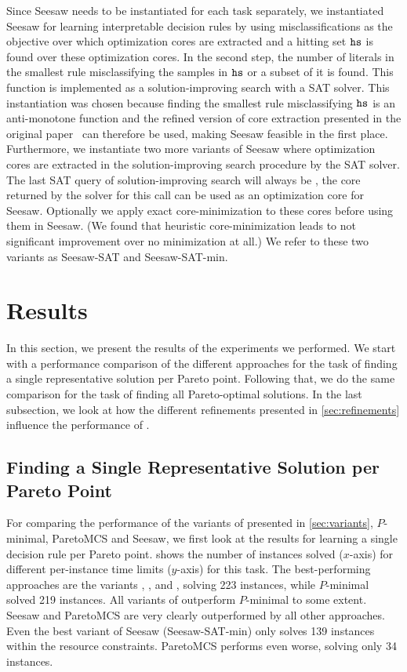 Since Seesaw needs to be instantiated for each task separately, we instantiated Seesaw for learning interpretable decision rules by using misclassifications as the objective over which optimization cores are extracted and a hitting set $\texttt{hs}$ is found over these optimization cores.
In the second step, the number of literals in the smallest rule misclassifying the samples in $\texttt{hs}$ or a subset of it is found.
This function is implemented as a solution-improving search with a SAT solver.
This instantiation was chosen because finding the smallest rule misclassifying $\texttt{hs}$ is an anti-monotone function and the refined version of core extraction presented in the original paper~\autocite{DBLP:conf/cp/JanotaMSM21} can therefore be used, making Seesaw feasible in the first place.
Furthermore, we instantiate two more variants of Seesaw where optimization cores are extracted in the solution-improving search procedure by the SAT solver.
The last SAT query of solution-improving search will always be \unsat{}, the core returned by the solver for this call can be used as an optimization core for Seesaw.
Optionally we apply exact core-minimization to these cores before using them in Seesaw.
(We found that heuristic core-minimization leads to not significant improvement over no minimization at all.)
We refer to these two variants as Seesaw-SAT and Seesaw-SAT-min.

\section{Results\label{sec:results}}

In this section, we present the results of the experiments we performed.
We start with a performance comparison of the different approaches for the task of finding a single representative solution per Pareto point.
Following that, we do the same comparison for the task of finding all Pareto-optimal solutions.
In the last subsection, we look at how the different refinements presented in \cref{sec:refinements} influence the performance of \algname{}.

\subsection{Finding a Single Representative Solution per Pareto Point}

For comparing the performance of the variants of \algname{} presented in \cref{sec:variants}, $P$-minimal, ParetoMCS and Seesaw, we first look at the results for learning a single decision rule per Pareto point.
 shows the number of instances solved ($x$-axis) for different per-instance time limits ($y$-axis) for this task.
The best-performing approaches are the \algname{} variants \msh{}, \satunsat{}, \unsatsat{} and \msu{}, solving 223 instances, while $P$-minimal solved 219 instances.
All variants of \algname{} outperform $P$-minimal to some extent.
Seesaw and ParetoMCS are very clearly outperformed by all other approaches.
Even the best variant of Seesaw (Seesaw-SAT-min) only solves 139 instances within the resource constraints.
ParetoMCS performs even worse, solving only 34 instances.

